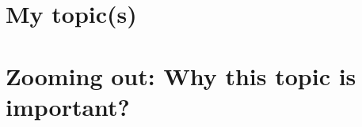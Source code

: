 \documentclass[a4paper,11pt,UKenglish,twoside,openright]{report}\usepackage[]{graphicx}\usepackage[]{color}
\begin{document}
\section{My topic(s)}

\section{Zooming out: Why this topic is important?}


\end{document}
